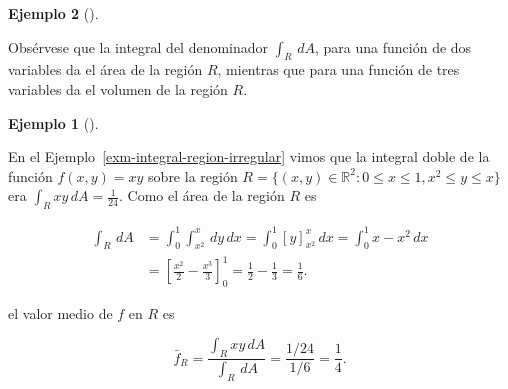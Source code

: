 \documentclass[
  a4paper,
]{scrreport}
\theoremstyle{definition}
\newtheorem{example}{Ejemplo}[chapter]
\theoremstyle{plain}
\theoremstyle{definition}
\theoremstyle{definition}
\theoremstyle{plain}
\theoremstyle{plain}
\theoremstyle{remark}
\begin{document}
\begin{example}[]
\begin{tcolorbox}
Obsérvese que la integral del denominador \(\int_R\,dA\), para una
función de dos variables da el área de la región \(R\), mientras que
para una función de tres variables da el volumen de la región \(R\).

\end{tcolorbox}

\begin{example}[]\protect\hypertarget{exm-valor-medio-funcion-varias-variables}{}\label{exm-valor-medio-funcion-varias-variables}

En el Ejemplo~\ref{exm-integral-region-irregular} vimos que la integral
doble de la función \(f(x,y)=xy\) sobre la región
\(R=\{(x,y)\in \mathbb{R}^2: 0\leq x\leq 1, x^2\leq y\leq x\}\) era
\(\int_R xy\,dA = \frac{1}{24}\). Como el área de la región \(R\) es

\begin{align*}
\int_R \,dA
&= \int_0^1 \int_{x^2}^x  \,dy\,dx
= \int_0^1 [y]_{x^2}^x\,dx
= \int_0^1 x-x^2\,dx \\
&= \left[\frac{x^2}{2}-\frac{x^3}{3}\right]_0^1
= \frac{1}{2}-\frac{1}{3}
= \frac{1}{6}.
\end{align*}

el valor medio de \(f\) en \(R\) es

\[
 \bar f_R 
 = \frac{\int_R xy\,dA}{\int_R\,dA}
 = \frac{1/24}{1/6} 
 = \frac{1}{4}.
 \]

\end{example}

\end{example}
\end{document}

